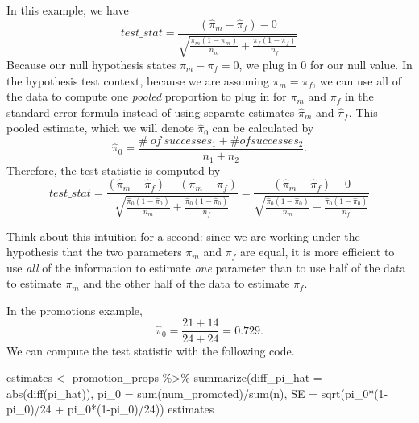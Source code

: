 \documentclass[
  letterpaper,
  DIV=11,
  numbers=noendperiod]{scrreprt}
\newenvironment{Shaded}{\begin{snugshade}}{\end{snugshade}}
\newcommand{\AttributeTok}[1]{\textcolor[rgb]{0.40,0.45,0.13}{#1}}
\newcommand{\DecValTok}[1]{\textcolor[rgb]{0.68,0.00,0.00}{#1}}
\newcommand{\FunctionTok}[1]{\textcolor[rgb]{0.28,0.35,0.67}{#1}}
\newcommand{\NormalTok}[1]{\textcolor[rgb]{0.00,0.23,0.31}{#1}}
\newcommand{\OtherTok}[1]{\textcolor[rgb]{0.00,0.23,0.31}{#1}}
\newcommand{\SpecialCharTok}[1]{\textcolor[rgb]{0.37,0.37,0.37}{#1}}
\theoremstyle{definition}
\theoremstyle{remark}
\begin{document}
In this example, we have
\[test\_stat = \frac{(\hat{\pi}_m - \hat{\pi}_f) - 0}{\sqrt{\frac{\pi_m(1-\pi_m)}{n_m} + \frac{\pi_f(1-\pi_f)}{n_f}}}\]
Because our null hypothesis states \(\pi_m - \pi_f = 0\), we plug in 0
for our null value. In the hypothesis test context, because we are
assuming \(\pi_m = \pi_f\), we can use all of the data to compute one
\emph{pooled} proportion to plug in for \(\pi_m\) and \(\pi_f\) in the
standard error formula instead of using separate estimates
\(\hat{\pi}_m\) and \(\hat{\pi}_f\). This pooled estimate, which we will
denote \(\hat{\pi}_0\) can be calculated by
\[\hat{\pi}_0 = \frac{\# \ of \ successes_1 + \# of successes_2}{n_1 + n_2}.\]
Therefore, the test statistic is computed by
\[test\_stat = \frac{(\hat{\pi}_m - \hat{\pi}_f) - (\pi_m - \pi_f)}{\sqrt{\frac{\hat{\pi}_0(1-\hat{\pi}_0)}{n_m} + \frac{\hat{\pi}_0(1-\hat{\pi}_0)}{n_f}}}=\frac{(\hat{\pi}_m - \hat{\pi}_f) - 0}{\sqrt{\frac{\hat{\pi}_0(1-\hat{\pi}_0)}{n_m} + \frac{\hat{\pi}_0(1-\hat{\pi}_0)}{n_f}}}\]

Think about this intuition for a second: since we are working under the
hypothesis that the two parameters \(\pi_m\) and \(\pi_f\) are equal, it
is more efficient to use \emph{all} of the information to estimate
\emph{one} parameter than to use half of the data to estimate \(\pi_m\)
and the other half of the data to estimate \(\pi_f\).

In the promotions example,
\[\hat{\pi}_0 = \frac{21 + 14}{24 + 24} = 0.729.\] We can compute the
test statistic with the following code.

\begin{Shaded}
\begin{Highlighting}[]
\NormalTok{estimates }\OtherTok{\textless{}{-}}\NormalTok{ promotion\_props }\SpecialCharTok{\%\textgreater{}\%} 
  \FunctionTok{summarize}\NormalTok{(}\AttributeTok{diff\_pi\_hat =} \FunctionTok{abs}\NormalTok{(}\FunctionTok{diff}\NormalTok{(pi\_hat)),}
            \AttributeTok{pi\_0 =} \FunctionTok{sum}\NormalTok{(num\_promoted)}\SpecialCharTok{/}\FunctionTok{sum}\NormalTok{(n),}
            \AttributeTok{SE =} \FunctionTok{sqrt}\NormalTok{(pi\_0}\SpecialCharTok{*}\NormalTok{(}\DecValTok{1}\SpecialCharTok{{-}}\NormalTok{pi\_0)}\SpecialCharTok{/}\DecValTok{24} \SpecialCharTok{+}\NormalTok{ pi\_0}\SpecialCharTok{*}\NormalTok{(}\DecValTok{1}\SpecialCharTok{{-}}\NormalTok{pi\_0)}\SpecialCharTok{/}\DecValTok{24}\NormalTok{)) }
\NormalTok{estimates}
\end{Highlighting}
\end{Shaded}
\end{document}
